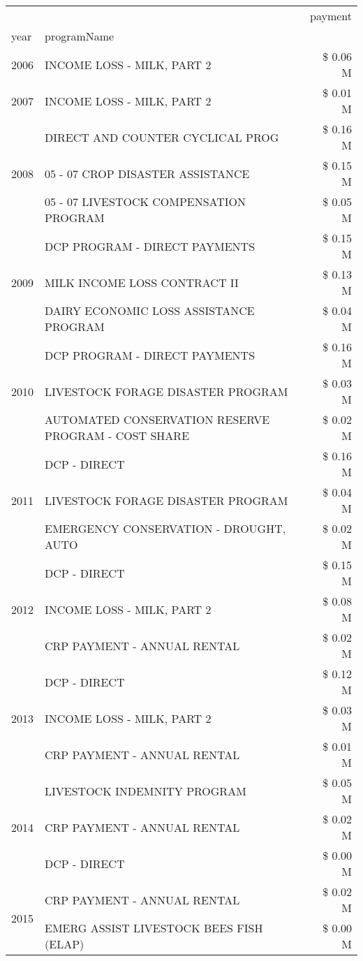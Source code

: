 \begin{tabular}{llr}
\toprule
 &  & payment \\
year & programName &  \\
\midrule
2006 & INCOME LOSS - MILK, PART 2 & \$ 0.06 M \\
\cline{1-3}
2007 & INCOME LOSS - MILK, PART 2 & \$ 0.01 M \\
\cline{1-3}
\multirow[t]{3}{*}{2008} & DIRECT AND COUNTER CYCLICAL PROG & \$ 0.16 M \\
 & 05 - 07 CROP DISASTER ASSISTANCE & \$ 0.15 M \\
 & 05 - 07 LIVESTOCK COMPENSATION PROGRAM & \$ 0.05 M \\
\cline{1-3}
\multirow[t]{3}{*}{2009} & DCP PROGRAM - DIRECT PAYMENTS & \$ 0.15 M \\
 & MILK INCOME LOSS CONTRACT II & \$ 0.13 M \\
 & DAIRY ECONOMIC LOSS ASSISTANCE PROGRAM & \$ 0.04 M \\
\cline{1-3}
\multirow[t]{3}{*}{2010} & DCP PROGRAM - DIRECT PAYMENTS & \$ 0.16 M \\
 & LIVESTOCK FORAGE DISASTER  PROGRAM & \$ 0.03 M \\
 & AUTOMATED CONSERVATION RESERVE PROGRAM - COST SHARE & \$ 0.02 M \\
\cline{1-3}
\multirow[t]{3}{*}{2011} & DCP - DIRECT & \$ 0.16 M \\
 & LIVESTOCK FORAGE DISASTER PROGRAM & \$ 0.04 M \\
 & EMERGENCY CONSERVATION - DROUGHT, AUTO & \$ 0.02 M \\
\cline{1-3}
\multirow[t]{3}{*}{2012} & DCP - DIRECT & \$ 0.15 M \\
 & INCOME LOSS - MILK, PART 2 & \$ 0.08 M \\
 & CRP PAYMENT - ANNUAL RENTAL & \$ 0.02 M \\
\cline{1-3}
\multirow[t]{3}{*}{2013} & DCP - DIRECT & \$ 0.12 M \\
 & INCOME LOSS - MILK, PART 2 & \$ 0.03 M \\
 & CRP PAYMENT - ANNUAL RENTAL & \$ 0.01 M \\
\cline{1-3}
\multirow[t]{3}{*}{2014} & LIVESTOCK INDEMNITY PROGRAM & \$ 0.05 M \\
 & CRP PAYMENT - ANNUAL RENTAL & \$ 0.02 M \\
 & DCP - DIRECT & \$ 0.00 M \\
\cline{1-3}
\multirow[t]{3}{*}{2015} & CRP PAYMENT - ANNUAL RENTAL & \$ 0.02 M \\
 & EMERG ASSIST LIVESTOCK BEES FISH (ELAP) & \$ 0.00 M \\

\end{tabular}
